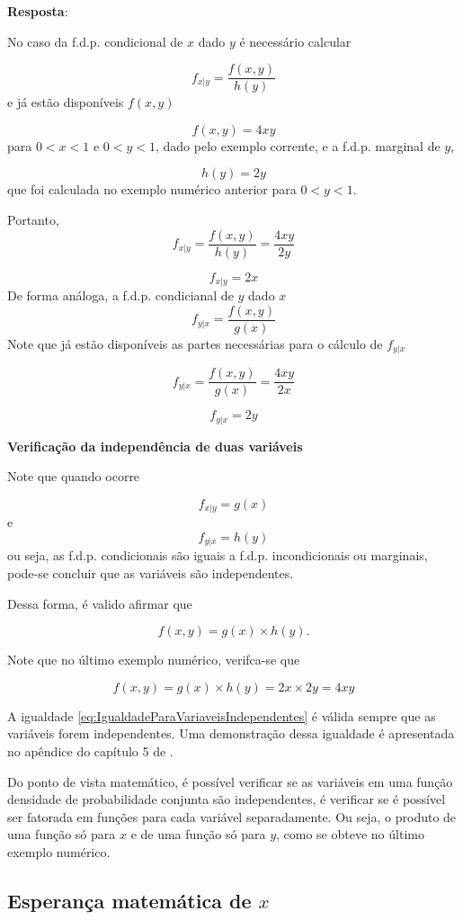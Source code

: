\documentclass[
]{book}
\begin{document}
\textbf{Resposta}:

No caso da f.d.p. condicional de \(x\) dado \(y\) é necessário calcular

\[
  f_{x|y} = \dfrac{f(x,y)}{h(y)}
\]
e já estão disponíveis \(f(x,y)\)

\[
  f(x,y) = 4xy
\]
para \(0 < x <1\) e \(0 < y < 1\), dado pelo exemplo corrente, e a f.d.p. marginal de \(y\),

\[
  h(y) = 2y
\]
que foi calculada no exemplo numérico anterior para \(0 < y < 1\).

Portanto,
\[
  f_{x|y} = \dfrac{f(x,y)}{h(y)} = \dfrac{4xy}{2y}
\]

\[
  f_{x|y} = 2x
\]
De forma análoga, a f.d.p. condicianal de \(y\) dado \(x\)
\[
  f_{y|x} = \dfrac{f(x,y)}{g(x)}
\]
Note que já estão disponíveis as partes necessárias para o cálculo de \(f_{y|x}\)

\[
  f_{y|x} = \dfrac{f(x,y)}{g(x)} = \frac{4xy}{2x}
\]

\[
  f_{y|x} = 2y
\]

\textbf{Verificação da independência de duas variáveis}

Note que quando ocorre

\[
  f_{x|y} = g(x)
\]
e
\[
  f_{y|x} = h(y)
\]
ou seja, as f.d.p. condicionais são iguais a f.d.p. incondicionais ou marginais, pode-se concluir que as variáveis são independentes.

Dessa forma, é valido afirmar que

\[
  f(x,y) = g(x) \times h(y).
  \label{eq:IgualdadeParaVariaveisIndependentes}
\]

Note que no último exemplo numérico, verifca-se que

\[
  f(x,y) = g(x) \times h(y) = 2x \times 2y = 4xy
\]

A igualdade \eqref{eq:IgualdadeParaVariaveisIndependentes} é válida sempre que as variáveis forem independentes. Uma demonstração dessa igualdade é apresentada no apêndice do capítulo 5 de \citet{Sartoris2013}.

Do ponto de vista matemático, é possível verificar se as variáveis em uma função densidade de probabilidade conjunta são independentes, é verificar se é possível ser fatorada em funções para cada variável separadamente. Ou seja, o produto de uma função só para \(x\) e de uma função só para \(y\), como se obteve no último exemplo numérico.

\hypertarget{esperanuxe7a-matemuxe1tica-de-x}{%
\subsection{\texorpdfstring{Esperança matemática de \(x\)}{Esperança matemática de x}}\label{esperanuxe7a-matemuxe1tica-de-x}}
\end{document}
